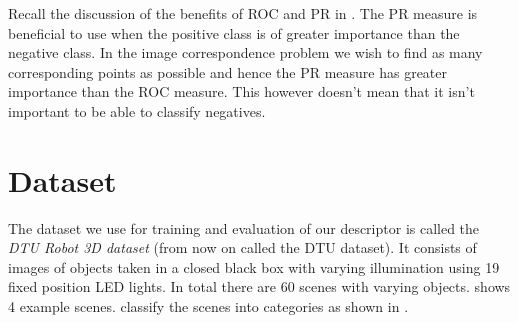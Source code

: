 \documentclass[thesis.tex]{subfiles}
\begin{document}
Recall the discussion of the benefits of ROC and PR in . The PR measure is beneficial to use when the positive class is of greater importance than the negative class. In the image correspondence problem we wish to find as many corresponding points as possible and hence the PR measure has greater importance than the ROC measure. This however doesn't mean that it isn't important to be able to classify negatives.


\section{Dataset}
\label{sec:dtuDataset}
The dataset we use for training and evaluation of our descriptor is called the \emph{DTU Robot 3D dataset} \cite{aanaes2010recall} (from now on called the DTU dataset). It consists of images of objects taken in a closed black box with varying illumination using 19 fixed position LED lights. In total there are 60 scenes with varying objects.  shows 4 example scenes. \citet{aanaes2010ground} classify the scenes into categories as shown in .
\end{document}
